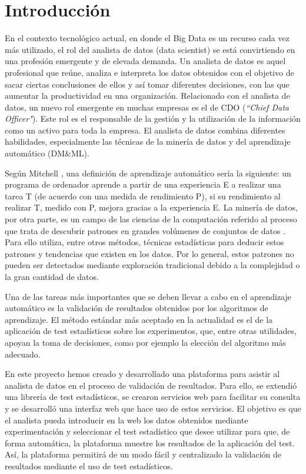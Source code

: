 
\chapter{Introducción}
En el contexto tecnológico actual, en donde el Big Data es un recurso cada vez más utilizado, el rol
del analista de datos (data scientist) se está convirtiendo en una profesión emergente y de elevada
demanda. Un analista de datos es aquel profesional que reúne, analiza e interpreta los datos obtenidos
con el objetivo de sacar ciertas conclusiones de ellos y así tomar diferentes decisiones, con las que
aumentar la productividad en una organización. Relacionado con el analista de datos, un nuevo rol emergente
en muchas empresas es el de CDO (\textit{``Chief Data Officer"}). Este rol es el responsable de la gestión
y la utilización de la información como un activo para toda la empresa. El analista de datos combina diferentes
habilidades, especialmente las técnicas de la minería de datos y del aprendizaje automático (DM\&ML).

Según Mitchell \cite{mitchell}, una definición de aprendizaje automático sería la siguiente: un programa
de ordenador aprende a partir de una experiencia E a realizar una tarea T (de acuerdo con una medida de
rendimiento P), si su rendimiento al realizar T, medido con P, mejora gracias a la experiencia E. La
minería de datos, por otra parte, es un campo de las ciencias de la computación referido al proceso que trata
de descubrir patrones en grandes volúmenes de conjuntos de datos \cite{mineria}. Para ello utiliza, entre
otros métodos, técnicas estadísticas para deducir estos patrones y tendencias que existen en los datos. Por
lo general, estos patrones no pueden ser detectados mediante exploración tradicional debido a la complejidad o
la gran cantidad de datos.

Una de las tareas más importantes que se deben llevar a cabo en el aprendizaje automático es la
validación de resultados obtenidos por los algoritmos de aprendizaje. El método estándar más aceptado
en la actualidad es el de la aplicación de test estadísticos sobre los experimentos, que, entre otras
utilidades, apoyan la toma de decisiones, como por ejemplo la elección del algoritmo más adecuado.

En este proyecto hemos creado y desarrollado una plataforma para asistir al analista de
datos en el proceso de validación de resultados. Para ello, se extendió una librería de test
estadísticos, se crearon servicios web para facilitar su consulta y se desarrolló una interfaz web
que hace uso de estos servicios. El objetivo es que el analista pueda introducir en la web los datos obtenidos
mediante experimentación y seleccionar el test estadístico que desee utilizar para que, de forma automática, la
plataforma muestre los resultados de la aplicación del test. Así, la plataforma permitirá de un modo fácil y
centralizado la validación de resultados mediante el uso de test estadísticos.

